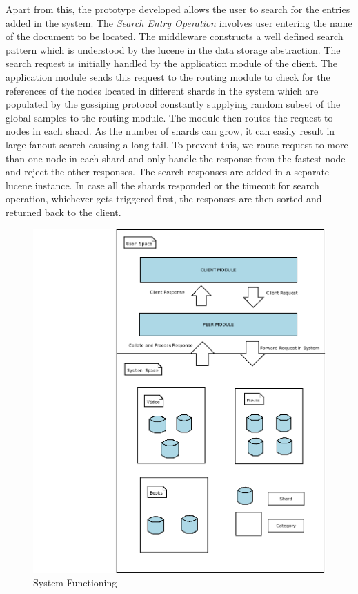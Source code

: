 \documentclass[a4paper,11pt]{kth-mag}
\begin{document}
\par Apart from this, the prototype developed allows the user to search for the entries added in the system. The \textit{Search Entry Operation} involves user entering the name of the document to be located. The middleware constructs a well defined search pattern which is understood by the lucene in the data storage abstraction. The search request is initially handled by the application module of the client. The application module sends this request to the routing module to check for the references of the nodes located in different shards in the system which are populated by the gossiping protocol constantly supplying random subset of the global samples to the routing module. The module then routes the request to nodes in each shard. As the number of shards can grow, it can easily result in large fanout search causing a long tail. To prevent this, we route request to more than one node in each shard and only handle the response from the fastest node and reject the other responses. The search responses are added in a separate lucene instance. In case all the shards responded or the timeout for search operation, whichever gets triggered first, the responses are then sorted and returned back to the client.


\begin{figure}[h]
	\includegraphics[scale=0.38]{OverallFunctioning}
	\hspace*{-5cm}  
	\caption{System Functioning}
	\label{fig:overall_function}
\end{figure}
\end{document}
